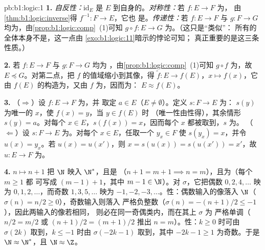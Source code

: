 \begin{solution}{pb:b1:logic:1}
\textbf{1.} \emph{自反性：}$\mathrm{id}_E$ 是 $E$
到自身的。\emph{对称性：}若 $f \colon E \to F$ 为，
由\cref{thm:b1:logic:inverse}得 $f^{-1} \colon F \to E$，它也
是。\emph{传递性：}若 $f \colon E \to F$ 与 $g \colon F
\to G$ 均为，由\cref{prop:b1:logic:comp}~(1)可知 $g \circ f
\colon E \to G$ 为。（这只是“类似”：
所有的全体本身不是，这一点由
\cref{exo:b1:logic:11}暗示的悖论可知；
真正重要的是这三条性质。）

\textbf{2.} 若 $f \colon E \to F$ 与 $g \colon F \to G$ 均为
，由\cref{prop:b1:logic:comp}~(1)可知 $g \circ f$ 为，故
$E \preceq G$。对第二点，把 $f$ 的值域缩小到其像，得
 $\tilde f \colon E \to f(E)$，$x \mapsto f(x)$，它由
$f(E)$ 的构造为，又由 $f$ 为，因而为：
$E \approx f(E)$。

\textbf{3.} （$\Rightarrow$）设 $f \colon E \to F$ 为，并
取定 $a \in E$（$E \neq \emptyset$）。定义 $s \colon F \to E$ 为：
$s(y)$ 为唯一的 $x$，使 $f(x) = y$，当 $y \in f(E)$ 时
（唯一性由性得），其余情形 $s(y) = a$。对每个 $x
\in E$，$s(f(x)) = x$，因而每个 $x$ 都被取到，$s$ 为。
（$\Leftarrow$）设 $s \colon F \to E$ 为。对每个 $x \in
E$，任取一个 $y_x \in F$ 使 $s(y_x) = x$，并令 $u(x) = y_x$。若
$u(x) = u(x')$，则 $x = s(u(x)) = s(u(x')) = x'$，故 $u \colon E \to F$
为。

\textbf{4.} $n \mapsto n + 1$ 把 $\N$ 映入 $\N^*$，且是
（$n + 1 = m + 1 \implies n = m$），且为（每个 $m \geq 1$ 都
可写成 $(m - 1) + 1$，其中 $m - 1 \in \N$）。对 $\sigma$，它把偶数
$0, 2, 4, \dots$ 映为 $0, 1, 2, \dots$，而奇数 $1, 3,
5, \dots$ 映为 $-1, -2, -3, \dots$。性：偶数输入的像落入
$\N$（$\sigma(n) = n/2 \geq 0$），奇数输入则落入
严格负整数（$\sigma(n) = -(n+1)/2 \leq -1$），因此两输入的像若相同，
则必在同一奇偶类内，而在其上 $\sigma$ 为
严格单调（$n/2 = m/2$ 或 $(n+1)/2 = (m+1)/2$ 推出 $n =
m$）。性：$k \geq 0$ 时可由 $\sigma(2k)$ 取到，$k \leq -1$ 时由
$\sigma(-2k - 1)$ 取到，其中 $-2k - 1 \geq 1$ 为奇数。于是 $\N \approx \N^*$，且
$\N \approx \Z$。


\end{solution}
